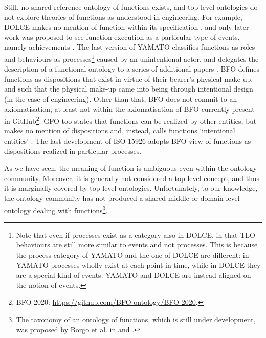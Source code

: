 \documentclass[sw]{iosart2x}
\newcommand{\DOLCE}{\textsc{DOLCE}\xspace} %
\newcommand{\YAMATO}{\textsc{YAMATO}\xspace}
\newcommand{\BFO}{\textsc{BFO}\xspace}
\newcommand{\GFO}{\textsc{GFO}\xspace}
\newcommand{\TLO}{\textnormal{TLO}\xspace}
\newcommand{\quotes}[1]{`#1'}
\newcommand{\TODO}[1]{{%
}}
\begin{document}
Still, no shared reference ontology of functions exists, and top-level ontologies do not explore theories of functions as understood in engineering. 
For example, \DOLCE makes no mention of function within its specification \cite{masoloWonderWebDeliverableD182003}, and only later work was proposed to see function execution as a particular type of events, namely achievements \cite{borgoCapabilitiesCapacitiesFunctionalities2021}. 
The last version of \YAMATO classifies functions as roles and behaviours as processes\footnote{Note that even if processes exist as a category also in \DOLCE, in that \TLO behaviours are still more similar to events and not processes. This is because the process category of \YAMATO and the one of \DOLCE are different: in \YAMATO processes wholly exist at each point in time, while in \DOLCE they are a special kind of events. \YAMATO  and \DOLCE are instead aligned on the notion of events. %
} 
caused by an unintentional actor, and delegates the description of a functional ontology to a series of additional papers \cite{kitamuraOntologicalModelDevice2006, kitamuraCharacterizingFunctionsBased2013, mizoguchiFunctionalOntologyArtifacts2009}. 
\BFO defines functions as dispositions %
that exist in virtue of their bearer's physical make-up, and such that the physical make-up came into being through intentional design (in the case of engineering). Other than that, \BFO does not commit to an axiomatisation, at least not within the axiomatisation of BFO currently present in GitHub\footnote{BFO 2020: \url{https://github.com/BFO-ontology/BFO-2020}.}.
\GFO too states that functions can be realized by other entities, but makes no mention of dispositions and, instead, calls functions \quotes{intentional entities} \cite{herreGeneralFormalOntology2006}.
The last development of ISO 15926 \cite{kluwerISO159261420202020} adopts \BFO view of functions as dispositions realized in particular processes.

As we have seen, 
the meaning of function is ambiguous even within the ontology community. 
Moreover, it is generally not considered a top-level concept, and thus it is marginally covered by top-level ontologies. 
Unfortunately, to our knowledge, the ontology community has not produced a shared middle or domain level ontology dealing with functions\footnote{The taxonomy of an ontology of functions, which is still under development, was proposed by Borgo et al. in \cite{borgoCapabilitiesCapacitiesFunctionalities2021} and \cite{borgoKnowledgebasedAdaptiveAgents2019}.}. 
\end{document}
